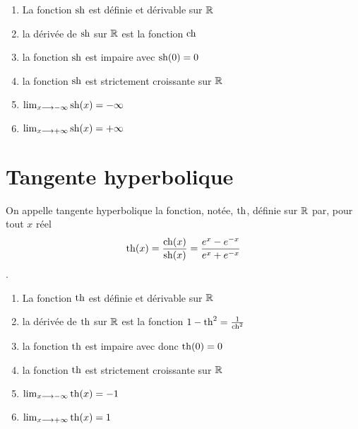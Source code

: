 \begin{defprop}
    \begin{enumerate}
        \item La fonction \(\operatorname{sh}\) est définie et dérivable sur \(\mathbb{R}\)
        \item la dérivée de \(\operatorname{sh}\) sur \(\mathbb{R}\) est la fonction \(\operatorname{ch}\)
        \item la fonction \(\operatorname{sh}\) est impaire avec \(\operatorname{sh}(0) =0\)
        \item la fonction \(\operatorname{sh}\) est strictement croissante sur \(\mathbb{R}\)
        \item \(\lim_{x\longrightarrow-\infty} \operatorname{sh}(x) = -\infty \)
        \item \(\lim_{x\longrightarrow+\infty} \operatorname{sh}(x) = +\infty \)
    \end{enumerate}    
\end{defprop}

\section{Tangente hyperbolique}
\begin{defprop}
    On appelle tangente hyperbolique la fonction, notée, \(\operatorname{th}\), définie sur \(\mathbb{R}\) par, pour tout \(x\) réel \[\operatorname{th}(x) = \frac{\operatorname{ch}(x)}{\operatorname{sh}(x)} = \frac{e^x-e^{-x}}{e^x+e^{-x}}\].
\end{defprop}
\begin{defprop}
    \begin{enumerate}
        \item La fonction \(\operatorname{th}\) est définie et dérivable sur \(\mathbb{R}\)
        \item la dérivée de \(\operatorname{th}\) sur \(\mathbb{R}\) est la fonction \(1-\operatorname{th}^2=\frac{1}{\operatorname{ch}^2}\)
        \item la fonction \(\operatorname{th}\) est impaire avec donc \(\operatorname{th}(0) =0\)
        \item la fonction \(\operatorname{th}\) est strictement croissante sur \(\mathbb{R}\)
        \item \(\lim_{x\longrightarrow-\infty} \operatorname{th}(x) = -1 \)
        \item \(\lim_{x\longrightarrow+\infty} \operatorname{th}(x) = 1 \)
    \end{enumerate}    
\end{defprop}

